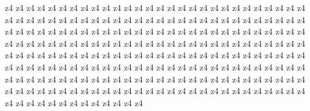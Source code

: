 {{        z4
        z4
        z4
        z4
        z4
        z4
        z4
        z4
        z4
        z4
        z4
        z4
        z4
        z4
        z4
        z4
        z4
        z4
        z4
        z4
        z4
        z4
        z4
        z4
        z4
        z4
        z4
        z4
        z4
        z4
        z4
        z4
        z4
        z4
        z4
        z4
        z4
        z4
        z4
        z4
        z4
        z4
        z4
        z4
        z4
        z4
        z4
        z4
        z4
        z4
        z4
        z4
        z4
        z4
        z4
        z4
        z4
        z4
        z4
        z4
        z4
        z4
        z4
        z4
        z4
        z4
        z4
        z4
        z4
        z4
        z4
        z4
        z4
        z4
        z4
        z4
        z4
        z4
        z4
        z4
        z4
        z4
        z4
        z4
        z4
        z4
        z4
        z4
        z4
        z4
        z4
        z4
        z4
        z4
        z4
        z4
        z4
        z4
        z4
        z4
        z4
        z4
        z4
        z4
        z4
        z4
        z4
        z4
        z4
        z4
        z4
        z4
        z4
        z4
        z4
        z4
        z4
        z4
        z4
        z4
        z4
        z4
        z4
        z4
        z4
        z4
        z4
        z4
        z4
        z4
        z4
        z4
        z4
        z4
        z4
        z4
        z4
        z4
        z4
        z4
        z4
        z4
        z4
        z4
        z4
        z4
        z4
        z4
        z4
        z4
        z4
        z4
        z4
        z4
        z4
        z4
        z4
        z4
        z4
        z4
        z4
        z4
        z4
        z4
        z4
        z4
        z4
        z4
        z4
        z4
        z4
        z4
        z4
        z4
        z4
        z4
        z4
        z4
        z4
        z4
        z4
        z4
        z4
        z4
        z4
        z4
        z4
        z4
        z4
        z4
        z4
        z4
        z4
        z4
        z4
        z4
        z4
        z4
        z4
        z4
        z4
        z4
        z4
        z4
        z4
        z4
        z4
        z4
        z4
        z4
        z4
        z4
        z4
        z4
        z4
        z4
        z4
        z4
        z4
        z4
        z4
        z4
        z4
        z4
        z4
        z4
        z4
        z4
        z4
        z4
        z4
        z4
        z4
        z4
        z4
        z4
        z4
}}
